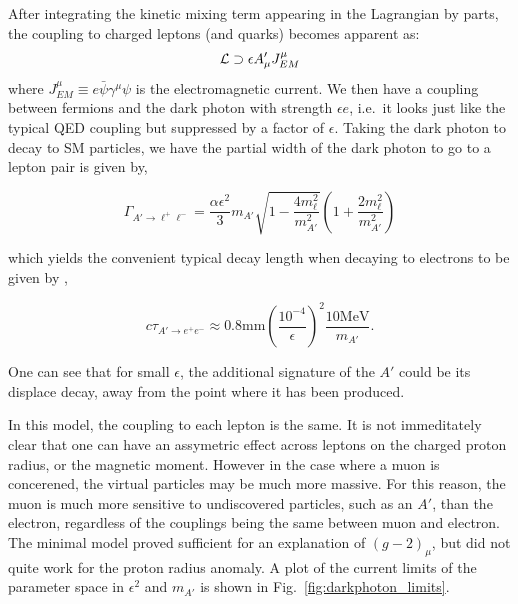 After integrating the kinetic mixing term appearing in the Lagrangian by parts, the coupling to charged leptons (and quarks) becomes apparent as:
\begin{equation}
    \label{eqn:darkphoton_qed_current}
    \operatorname{\mathcal{L}} \supset \epsilon A'_\mu J^\mu_{EM}
\end{equation}
where $J^\mu_{EM} \equiv e \bar{\psi} \gamma^\mu \psi$ is the electromagnetic current.
We then have a coupling between fermions and the dark photon with strength $\epsilon e$, i.e.\ it looks just like the typical QED coupling but suppressed by a factor of $\epsilon$.
Taking the dark photon to decay to SM particles, we have the partial width of the dark photon to go to a lepton pair is given by,

\begin{equation}
    \Gamma_{A' \rightarrow \ell^+ \ell^-} = \frac{\alpha \epsilon^2}{3} m_{A'} \sqrt{1-\frac{4 m_\ell^2}{m_{A'}^2}}\left(1 + \frac{2 m_\ell^2}{m_{A'}^2}\right)
\end{equation}

\noindent which yields the convenient typical decay length when decaying to electrons to be given by \cite{Echenard:2014lma},

\begin{equation}
    c \tau_{A' \rightarrow e^+ e^-} \approx 0.8\textrm{mm} \left(\frac{10^{-4}}{\epsilon}\right)^2 \frac{10\textrm{MeV}}{m_{A'}}\textrm{.}
\end{equation}

\noindent One can see that for small $\epsilon$, the additional signature of the $A'$ could be its displace decay, away from the point where it has been produced.

In this model, the coupling to each lepton is the same.
It is not immeditately clear that one can have an assymetric effect across leptons on the charged proton radius, or the magnetic moment.
However in the case where a muon is concerened, the virtual particles may be much more massive.
For this reason, the muon is much more sensitive to undiscovered particles, such as an $A'$, than the electron, regardless of the couplings being the same between muon and electron.
The minimal model proved sufficient for an explanation of $(g-2)_\mu$, but did not quite work for the proton radius anomaly.
A plot of the current limits of the parameter space in $\epsilon^2$ and $m_{A'}$ is shown in Fig.\ \ref{fig:darkphoton_limits}.

